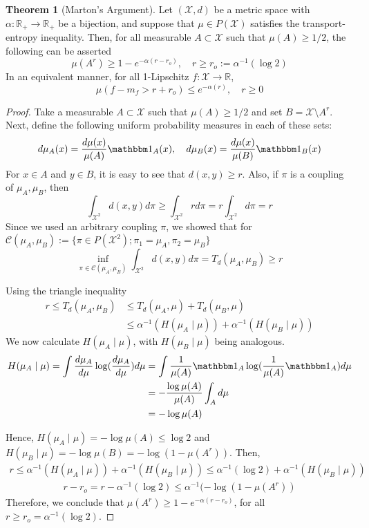 \documentclass[10pt]{article}
\theoremstyle{definition}
\newtheorem{theorem}{Theorem}
\begin{document}
\begin{theorem}[Marton's Argument] Let $(\mathcal X, d)$ be a metric space with
$\alpha: \mathbb R_+ \rightarrow \mathbb R_+$
be a bijection, and suppose that $\mu \in P(\mathcal X)$ satisfies the
transport-entropy inequality. Then, for all measurable $A \subset \mathcal X$ such
that $\mu(A) \geq 1/2$, the following can be asserted
$$
\mu(A^r) \geq 1 - e^{-\alpha (r - r_o)}, \quad r \geq r_o := \alpha^{-1}(\log 2)
$$
In an equivalent manner, for all 1-Lipschitz $f:\mathcal X \rightarrow \mathbb R$,
$$
\mu(f - m_f > r + r_o) \leq e ^{-\alpha(r)}, \quad r \geq 0
$$

\begin{proof}
	Take a measurable $A \subset \mathcal X$ such that $\mu(A) \geq 1/2$ and set
	$B = \mathcal X \setminus A^r$. Next, define the following uniform 
	probability measures in each of these sets:
	$$
	d\mu_A(x) = \frac{d\mu(x)}{\mu(A)}\mathbbm 1_A(x)
	,\quad  d\mu_B(x) = \frac{d\mu(x)}{\mu(B)}\mathbbm 1_B(x)
	$$
	For $x \in A$ and $y \in B$, it is easy to see that $d(x,y) \geq r$. Also,
	if $\pi$ is a coupling of $\mu_A, \mu_B$, then
	$$
	\int_{\mathcal X^2} d(x,y) d\pi \geq 
	\int_{\mathcal X^2} r d\pi = r \int_{\mathcal X^2} d\pi = r
	$$
	Since we used an arbitrary coupling $\pi$, we showed that for
	$\mathcal C(\mu_A,\mu_B) := \{\pi \in P(\mathcal X^2);
	\pi_1 = \mu_A, \pi_2 = \mu_B\}$
	$$
	\inf_{\pi \in \mathcal C(\mu_A,\mu_B)}\int_{\mathcal X^2} d(x,y) d\pi = 
	T_d(\mu_A,\mu_B)\geq  r
	$$

	Using the triangle inequality
	\begin{align*}
		r \leq T_d(\mu_A, \mu_B) &\leq T_d(\mu_A,\mu) + T_d(\mu_B,\mu) \\
		&\leq
		\alpha^{-1}(H(\mu_A \mid \mu)) + 
		\alpha^{-1}(H(\mu_B \mid \mu))
	\end{align*}
	We now calculate $H(\mu_A \mid \mu)$, with $H(\mu_B \mid \mu)$ being analogous.
	\begin{align*}
	H(\mu_A \mid \mu) =  \int \frac{d\mu_A}{d\mu}\log (\frac{d\mu_A}{d\mu}) d\mu
	&=\int \frac{1}{\mu(A)} \mathbbm 1_A \log(\frac{1}{\mu(A)}\mathbbm 1_A) d\mu
	\\
	&=-\frac{\log\mu(A)}{\mu(A)}\int_A d\mu \\
	&= - \log\mu(A)
	\end{align*}

	Hence, $H(\mu_A \mid \mu) = - \log\mu(A) \leq \log 2$ and
	$H(\mu_B \mid \mu) = - \log\mu(B) = -\log(1-\mu(A^r))$. Then,
	\begin{align*}
	r  \leq 
		\alpha^{-1}(H(\mu_A \mid \mu)) + 
		\alpha^{-1}(H(\mu_B \mid \mu)) \leq 
		\alpha^{-1}(\log2) + 
		\alpha^{-1}(H(\mu_B \mid \mu))
	\end{align*}
	\begin{align*}
	r - r_o  = r - \alpha^{-1}(\log2) \leq
	\alpha^{-1}(-\log(1-\mu(A^r))
	\end{align*}
	Therefore, we conclude that $\mu(A^r) \geq 1- e^{-\alpha(r-r_o)}$, for all
	$r \geq r_o = \alpha^{-1}(\log2)$.


\end{proof}
\end{theorem}
\end{document}
